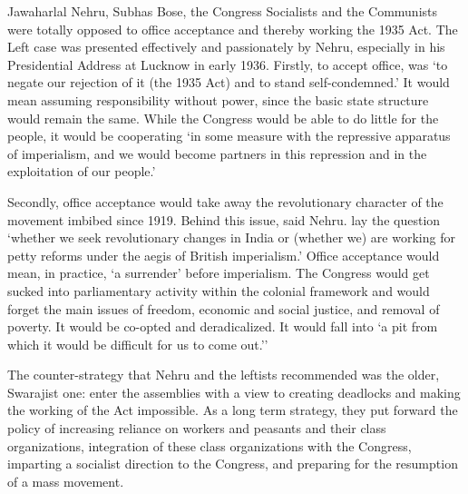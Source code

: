 Jawaharlal Nehru, Subhas Bose, the Congress Socialists and the Communists were totally opposed to office acceptance and thereby working the 1935 Act. The Left case was presented effectively and passionately by Nehru, especially in his Presidential Address at Lucknow in early 1936. Firstly, to accept office, was `to negate our rejection of it (the 1935 Act) and to stand self-condemned.' It would mean assuming responsibility without power, since the basic state structure would remain the same. While the Congress would be able to do little for the people, it would be cooperating `in some measure with the repressive apparatus of imperialism, and we would become partners in this repression and in the exploitation of our people.' 

Secondly, office acceptance would take away the revolutionary character of the movement imbibed since 1919. Behind this issue, said Nehru. lay the question `whether we seek revolutionary changes in India or (whether we) are working for petty reforms under the aegis of British imperialism.' Office acceptance would mean, in practice, `a surrender' before imperialism. The Congress would get sucked into parliamentary activity within the colonial framework and would forget the main issues of freedom, economic and social justice, and removal of poverty. It would be co-opted and deradicalized. It would fall into `a pit from which it would be difficult for us to come out.'' 

The counter-strategy that Nehru and the leftists recommended was the older, Swarajist one: enter the assemblies with a view to creating deadlocks and making the working of the Act impossible. As a long term strategy, they put forward the policy of increasing reliance on workers and peasants and their class organizations, integration of these class organizations with the Congress, imparting a socialist direction to the Congress, and preparing for the resumption of a mass movement. 

